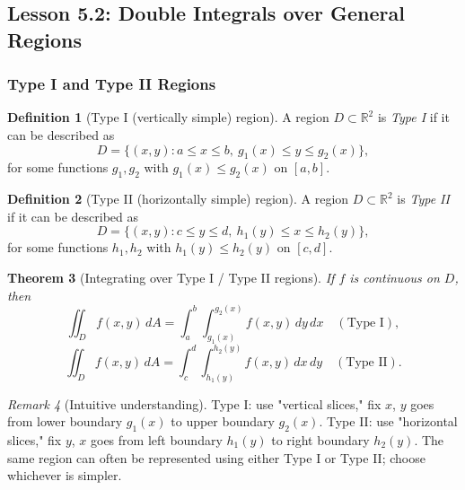 \documentclass[12pt]{article}
\numberwithin{equation}{section}
\newcommand{\RR}{\mathbb{R}}
\theoremstyle{plain}
\newtheorem{theorem}{Theorem}[section]
\theoremstyle{definition}
\newtheorem{definition}[theorem]{Definition}
\theoremstyle{remark}
\newtheorem{remark}[theorem]{Remark}
\begin{document}
\subsection{Lesson 5.2: Double Integrals over General Regions}

\subsubsection{Type I and Type II Regions}

\begin{definition}[Type I (vertically simple) region]\label{def:typeI}
A region $D\subset\RR^2$ is \emph{Type I} if it can be described as
\[
D=\{(x,y): a\le x\le b,\ g_1(x)\le y\le g_2(x)\},
\]
for some functions $g_1,g_2$ with $g_1(x)\le g_2(x)$ on $[a,b]$.
\end{definition}

\begin{definition}[Type II (horizontally simple) region]\label{def:typeII}
A region $D\subset\RR^2$ is \emph{Type II} if it can be described as
\[
D=\{(x,y): c\le y\le d,\ h_1(y)\le x\le h_2(y)\},
\]
for some functions $h_1,h_2$ with $h_1(y)\le h_2(y)$ on $[c,d]$.
\end{definition}

\begin{theorem}[Integrating over Type I / Type II regions]\label{thm:typeI-II-integrals}
If $f$ is continuous on $D$, then
\[
\iint_D f(x,y)\,dA=\int_{a}^{b}\int_{g_1(x)}^{g_2(x)} f(x,y)\,dy\,dx
\quad (\text{Type I}),
\]
\[
\iint_D f(x,y)\,dA=\int_{c}^{d}\int_{h_1(y)}^{h_2(y)} f(x,y)\,dx\,dy
\quad (\text{Type II}).
\]
\end{theorem}

\begin{remark}[Intuitive understanding]
Type I: use "vertical slices," fix $x$, $y$ goes from lower boundary $g_1(x)$ to upper boundary $g_2(x)$.  
Type II: use "horizontal slices," fix $y$, $x$ goes from left boundary $h_1(y)$ to right boundary $h_2(y)$.  
The same region can often be represented using either Type I or Type II; choose whichever is simpler.
\end{remark}
\end{document}
